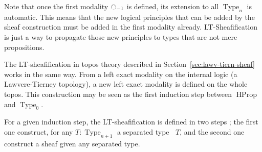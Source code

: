 \documentclass[preprint,9pt,numbers]{sigplanconf}
\newcommand{\mynote}[2]{
    \fbox{\bfseries\sffamily\scriptsize#1}
    {\small$\blacktriangleright$\textsf{\emph{#2}}$\blacktriangleleft$}~}
\newcommand\kq[1]{\mynote{KQ}{#1}}
\DeclareMathOperator{\Type}{Type}
\DeclareMathOperator{\HProp}{HProp}
\newcommand{\modal}{\ensuremath{\ocircle}}
\newcommand \separated {\mathop{\square_{n+1}} }
\newenvironment{mymath}[1][-0em]{%
  \newcommand\mymathaux{\vspace{#1}}%
  \vspace{#1}%
  \begin{equation*}%
  }{ %
    \mymathaux%
  \end{equation*}}
\begin{document}
\label{sec:sheaf-left-exact}Note that once the first modality $\modal_{-1}$ is defined, its
extension to all $\Type_n$ is automatic. This means that the new
logical principles that can be added by the sheaf construction must be
added in the first modality already. LT-Sheafification is just a way
to propagate those new principles to types that are not mere
propositions.





The LT-sheafification in topos theory described in
Section~\ref{sec:lawv-tiern-sheaf} works in the same way. 
%
From a left exact modality on the internal logic (a Lawvere-Tierney
topology), a new left exact modality is defined on the whole topos.
%
This construction may be seen as the first induction step between
$\HProp$ and $\Type_0$. 


For a given induction step, the LT-sheafification is defined in two
steps ; the first one construct, for any $T:\Type_{n+1}$ a separated
type $\separated T$, and the second one construct a sheaf given any
separated type.


\end{document}
